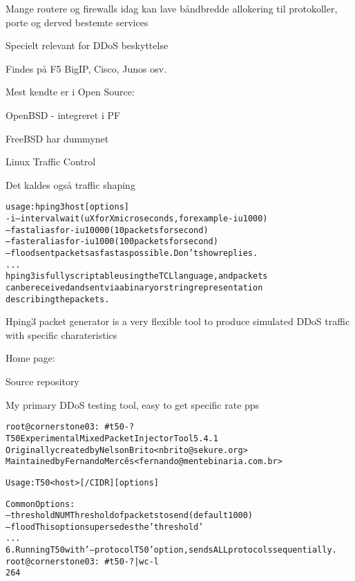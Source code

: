 \documentclass[Screen16to9,17pt]{foils}
\begin{document}

\begin{list1}
\item Mange routere og firewalls idag kan lave båndbredde allokering til
  protokoller, porte og derved bestemte services
  \item Specielt relevant for DDoS beskyttelse
  \item Findes på F5 BigIP, Cisco, Junos osv.
\item Mest kendte er i Open Source:
\begin{list2}
\item OpenBSD - integreret i PF
\item FreeBSD har dummynet
\item Linux Traffic Control
\end{list2}
\item Det kaldes også traffic shaping
\end{list1}


\begin{alltt}\footnotesize
usage: hping3 host [options]
  -i  --interval  wait (uX for X microseconds, for example -i u1000)
      --fast      alias for -i u10000 (10 packets for second)
      --faster    alias for -i u1000 (100 packets for second)
      --flood      sent packets as fast as possible. Don't show replies.
...
hping3 is fully scriptable using the TCL language, and packets
can be received and sent via a binary or string representation
describing the packets.
\end{alltt}

\begin{list2}
\item Hping3 packet generator is a very flexible tool to produce simulated DDoS traffic with specific charateristics
\item Home page: 
\item Source repository 
\end{list2}

\centerline{My primary DDoS testing tool, easy to get specific rate pps}



\begin{alltt}\footnotesize
root@cornerstone03:~# t50 -?
T50 Experimental Mixed Packet Injector Tool 5.4.1
Originally created by Nelson Brito <nbrito@sekure.org>
Maintained by Fernando Mercês <fernando@mentebinaria.com.br>

Usage: T50 <host> [/CIDR] [options]

Common Options:
    --threshold NUM        Threshold of packets to send     (default 1000)
    --flood                This option supersedes the 'threshold'
...
6. Running T50 with '--protocol T50' option, sends ALL protocols sequentially.
root@cornerstone03:~# t50 -? | wc -l
264
\end{alltt}
\end{document}

